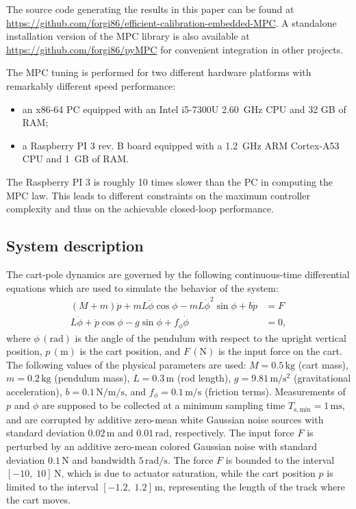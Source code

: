 \documentclass{article}
\newcommand{\Tsmin}{T_{\mathrm{s,min}}}
\begin{document}
The source code generating the results in this paper can be found at \url{https://github.com/forgi86/efficient-calibration-embedded-MPC}. 
A standalone installation version of the MPC library is also available at \url{https://github.com/forgi86/pyMPC} for convenient integration in other projects.

The MPC tuning is performed for two different hardware platforms with remarkably different speed performance:
\begin{itemize}
\item an x86-64 PC equipped with an Intel i5-7300U 2.60~GHz CPU and 32  GB  of  RAM;
\item a Raspberry PI 3 rev. B board equipped with a 1.2~GHz ARM Cortex-A53 CPU and 1~GB of RAM.
\end{itemize}

The Raspberry PI 3 is roughly 10 times slower than the PC in computing the MPC law. This leads to different constraints on the maximum controller complexity and thus on the achievable closed-loop performance. 

\subsection{System description}
The cart-pole  dynamics are governed by the  following continuous-time differential equations which are used to simulate the behavior of the system:  
	\begin{align*} 
	(M+m)\ddot p + mL\ddot\phi \cos\phi - mL \dot \phi ^2 \sin \phi + b\dot p &= F\\
	L \ddot \phi + \ddot p \cos \phi - g \sin\phi + f_\phi\dot \phi &=0 ,
	\end{align*}
where  $\phi\,\mathrm{(rad)}$ is the angle of the pendulum with respect to the upright vertical position, $p\,\mathrm{(m)}$ is the cart position, and $F\,\mathrm{(N)}$  is the input force  on the cart. The following values of the physical parameters are used:  $M=0.5\,\mathrm{kg}$ (cart mass), $m=0.2\,\mathrm{kg}$ (pendulum mass), $L=0.3\,\mathrm{m}$ (rod length), 
$g=9.81\,\mathrm{m/s^{2}}$ (gravitational acceleration), $b=0.1\,\mathrm{N/m/s}$, and $f_\phi=0.1\,\mathrm{m/s}$ (friction terms). 
Measurements of $p$ and $\phi$
are supposed to be collected at a minimum sampling time $\Tsmin=1\,\mathrm{ms}$, and are  corrupted by additive zero-mean white Gaussian noise sources with standard deviation $0.02\,\mathrm{m}$ and $0.01\,\mathrm{rad}$, respectively. The input force $F$ is  perturbed by an additive zero-mean colored Gaussian noise  with standard deviation $0.1\,\mathrm{N}$ and bandwidth $5\,\mathrm{rad/s}$. 
The force $F$ is bounded to the interval  $[-10,\; 10]\, \mathrm{N}$, which is due to actuator saturation, while the cart position $p$ is limited to the interval $[-1.2,\;   1.2]\,\mathrm{m}$, representing the length of the track where the cart moves.
\end{document}
